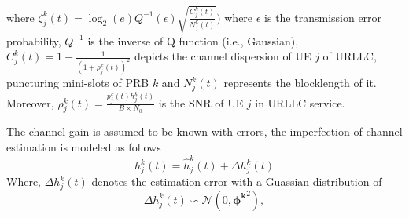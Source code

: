 \documentclass[conference]{IEEEtran}
\begin{document}
where $\zeta_{j}^k(t) = \log_2({e})Q^{-1}(\epsilon) \sqrt{\frac{C_{j}^k(t)}{N_{j}^k(t)}})$
where $\epsilon$ is the transmission error probability, $Q^{-1}$ is the inverse of Q function (i.e., Gaussian),
$C_{j}^k(t) = 1 - \frac{1}{(1+\rho_{j}^k(t))^2}$ depicts the channel dispersion of UE $j$ of URLLC, puncturing mini-slots of PRB $k$ and
$N_{j}^k(t)$ represents the blocklength of it. Moreover, $\rho_{j}^k(t)=\frac{p^k_j(t)h^k_j(t)}{B \times N_0}$ is the SNR of UE $j$ in URLLC service. 

The channel gain is assumed to be known with errors, the imperfection of channel estimation is
modeled as follows
\begin{equation}
h^k_j(t) = \hat{h}^k_j(t) + \Delta h^k_j(t)
\end{equation}
Where, $\Delta h^k_j(t)$ denotes the estimation error with a Guassian distribution of
 \begin{equation}
\Delta h^k_j(t)\backsim \mathcal{N}(0,\boldsymbol{\phi^k}^2),
\end{equation}
\end{document}
